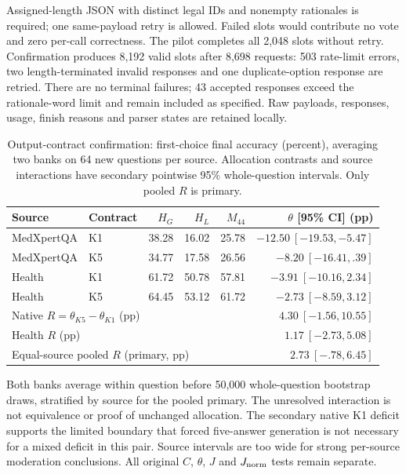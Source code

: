Assigned-length JSON with distinct legal IDs and nonempty rationales is required; one same-payload retry is allowed. Failed slots would contribute no vote and zero per-call correctness. The pilot completes all 2,048 slots without retry. Confirmation produces 8,192 valid slots after 8,698 requests: 503 rate-limit errors, two length-terminated invalid responses and one duplicate-option response are retried. There are no terminal failures; 43 accepted responses exceed the rationale-word limit and remain included as specified. Raw payloads, responses, usage, finish reasons and parser states are retained locally.

\begin{table}[h]
\centering\small
\caption{Output-contract confirmation: first-choice final accuracy (percent), averaging two banks on 64 new questions per source. Allocation contrasts and source interactions have secondary pointwise 95\% whole-question intervals. Only pooled $R$ is primary.}
\label{tab:contract}
\begin{tabular}{llrrrr}
\toprule
Source & Contract & $H_G$ & $H_L$ & $M_{44}$ & $\theta$ [95\% CI] (pp)\\
\midrule
MedXpertQA & K1 &38.28&16.02&25.78&$-12.50\ [-19.53,-5.47]$\\
MedXpertQA & K5 &34.77&17.58&26.56&$-8.20\ [-16.41,.39]$\\
Health & K1 &61.72&50.78&57.81&$-3.91\ [-10.16,2.34]$\\
Health & K5 &64.45&53.12&61.72&$-2.73\ [-8.59,3.12]$\\
\midrule
\multicolumn{5}{l}{Native $R=\theta_{K5}-\theta_{K1}$ (pp)} &$4.30\ [-1.56,10.55]$\\
\multicolumn{5}{l}{Health $R$ (pp)} &$1.17\ [-2.73,5.08]$\\
\multicolumn{5}{l}{Equal-source pooled $R$ (primary, pp)} &$2.73\ [-.78,6.45]$\\
\bottomrule
\end{tabular}
\end{table}

Both banks average within question before 50,000 whole-question bootstrap draws, stratified by source for the pooled primary. The unresolved interaction is not equivalence or proof of unchanged allocation. The secondary native K1 deficit supports the limited boundary that forced five-answer generation is not necessary for a mixed deficit in this pair. Source intervals are too wide for strong per-source moderation conclusions. All original $C$, $\theta$, $J$ and $J_{\rm norm}$ tests remain separate.

